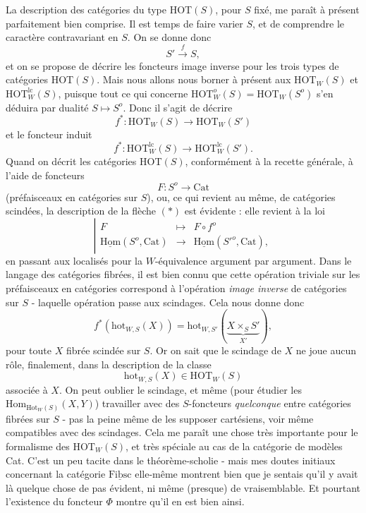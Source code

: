 \documentclass[11pt]{article}
\newcommand{\printedpage}[1]{\marginpar{\footnotesize p.~#1}}
\newcommand{\msp}[1]{\marginpar{\footnotesize [#1]}}
\newcommand{\Hom}{\mathrm{Hom}}
\newcommand{\HOT}{\mathrm{HOT}}
\newcommand{\hot}{\mathrm{hot}}
\newcommand{\Cat}{\mathrm{Cat}}
\begin{document}
La description des catégories du type HOT$(S)$, pour $S$ fixé, me paraît à présent parfaitement bien comprise. Il est temps de faire varier $S$, et de comprendre le caractère contravariant en $S$. On se donne donc
\[S' \xrightarrow{f} S,\]
et on se propose de décrire les foncteurs image inverse pour les trois types de catégories HOT$(S)$. Mais nous allons nous borner à présent aux $\HOT_W(S)$ et $\HOT^{\mathrm{lc}}_W(S)$, puisque tout ce qui concerne $\HOT^o_W(S) = \HOT_W(S^o)$ s'en déduira par dualité $S \longmapsto S^o$. Donc il s'agit de décrire
\msp{page 116}
\[f^* : \HOT_W(S) \longrightarrow \HOT_W(S') \tag*{$(*)$}\]
et le foncteur induit
\[f^* : \HOT^{\mathrm{lc}}_W(S) \longrightarrow \HOT^{\mathrm{lc}}_W(S').\]
Quand on décrit les catégories HOT$(S)$, conformément à la recette générale, à l'aide de foncteurs
\[F : S^o \longrightarrow \Cat\]
(préfaisceaux en catégories sur $S$), ou, ce qui revient au même, de catégories scindées, la description de la flèche $(*)$ est évidente : elle revient à la loi
\[\left|\begin{array}{rcl}
F & \longmapsto & F \circ f^o \\[1ex]
\underline{\mathrm{Hom}}(S^o, \Cat) & \longrightarrow & \underline{\mathrm{Hom}}(S'^o, \Cat),
\end{array}\right.\]
en passant aux localisés pour la $W$-équivalence argument par argument. Dans le langage des catégories fibrées, il est bien connu que cette opération triviale sur les préfaisceaux en catégories correspond à l'opération \textit{image inverse} de catégories sur $S$ - laquelle opération passe aux scindages. Cela nous donne donc
\[f^*(\hot_{W,S}(X)) = \hot_{W,S'}(\underbrace{X \times_S S'}_{X'}),\]
pour toute $X$ fibrée scindée sur $S$. Or on sait que le scindage de $X$ ne joue aucun rôle, finalement, dans la description de la classe
\[\hot_{W,S}(X) \in \HOT_W(S)\]
\printedpage{73}
\msp{page 117}
associée à $X$. On peut oublier le scindage, et même (pour étudier les $\Hom_{\mathrm{Hot}_W(S)}(X, Y)$) travailler avec des $S$-foncteurs \textit{quelconque} entre catégories fibrées sur $S$ - pas la peine même de les supposer cartésiens, voir même compatibles avec des scindages. Cela me paraît une chose très importante pour le formalisme des $\HOT_W(S)$, et très spéciale au cas de la catégorie de modèles Cat. C'est un peu tacite dans le théorème-scholie - mais mes doutes initiaux concernant la catégorie $\underline{\mathrm{Fibsc}}$ elle-même montrent bien que je sentais qu'il y avait là quelque chose de pas évident, ni même (presque) de vraisemblable. Et pourtant l'existence du foncteur $\Phi$ montre qu'il en est bien ainsi.
\end{document}
